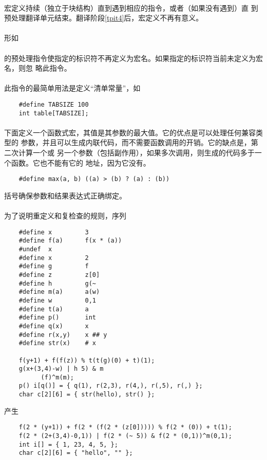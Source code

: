 \paragraph{}
宏定义持续（独立于块结构）直到遇到相应的指令，或者（如果没有遇到）直
到预处理翻译单元结束。翻译阶段\ref{tpit4}后，宏定义不再有意义。

\paragraph{}
形如                                                                          \\
\mbox{\hspace{4em} }                     \\
的预处理指令使指定的标识符不再定义为宏名。如果指定的标识符当前未定义为宏名，则忽
略此指令。

\paragraph{}
\ex 此指令的最简单用法是定义``清单常量''，如
\begin{lstlisting}
    #define TABSIZE 100
    int table[TABSIZE];
\end{lstlisting}

\paragraph{}
\ex 下面定义一个函数式宏，其值是其参数的最大值。它的优点是可以处理任何兼容类型的
参数，并且可以生成内联代码，而不需要函数调用的开销。它的缺点是，第二次计算一个或
另一个参数（包括副作用），如果多次调用，则生成的代码多于一个函数。它也不能有它的
地址，因为它没有。
\begin{lstlisting}
    #define max(a, b) ((a) > (b) ? (a) : (b))
\end{lstlisting}
括号确保参数和结果表达式正确绑定。

\paragraph{}
\ex 为了说明重定义和复检查的规则，序列
\begin{lstlisting}
    #define x         3
    #define f(a)      f(x * (a))
    #undef  x
    #define x         2
    #define g         f
    #define z         z[0]
    #define h         g(~
    #define m(a)      a(w)
    #define w         0,1
    #define t(a)      a
    #define p()       int
    #define q(x)      x
    #define r(x,y)    x ## y
    #define str(x)    # x

    f(y+1) + f(f(z)) % t(t(g)(0) + t)(1);
    g(x+(3,4)-w) | h 5) & m
          (f)^m(m);
    p() i[q()] = { q(1), r(2,3), r(4,), r(,5), r(,) };
    char c[2][6] = { str(hello), str() };
\end{lstlisting}
产生
\begin{lstlisting}
    f(2 * (y+1)) + f(2 * (f(2 * (z[0])))) % f(2 * (0)) + t(1);
    f(2 * (2+(3,4)-0,1)) | f(2 * (~ 5)) & f(2 * (0,1))^m(0,1);
    int i[] = { 1, 23, 4, 5, };
    char c[2][6] = { "hello", "" };
\end{lstlisting}

